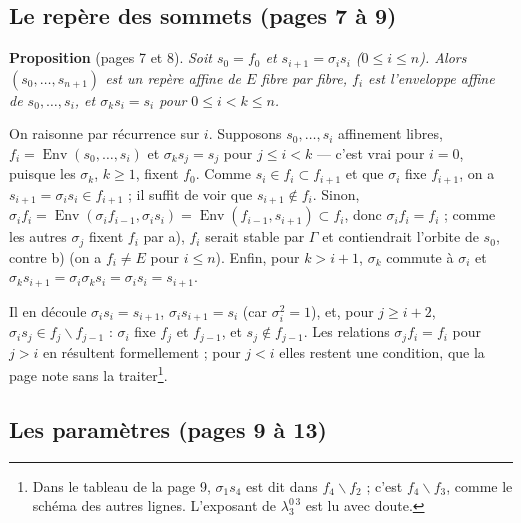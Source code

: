 \documentclass[11pt,a4paper]{article}
\begin{document}
\subsection*{Le repère des sommets (pages 7 à 9)}

\textbf{Proposition} (pages 7 et 8). \emph{Soit $s_0 = f_0$ et $s_{i+1} =
\sigma_i s_i$ ($0 \leq i \leq n$). Alors $(s_0, \dots, s_{n+1})$ est un repère
affine de $E$ fibre par fibre, $f_i$ est l'enveloppe affine de $s_0, \dots,
s_i$, et $\sigma_k s_i = s_i$ pour $0 \leq i < k \leq n$.}

On raisonne par récurrence sur $i$. Supposons $s_0, \dots, s_i$ affinement
libres, $f_i = \operatorname{Env}(s_0, \dots, s_i)$ et $\sigma_k s_j = s_j$ pour
$j \leq i < k$ --- c'est vrai pour $i = 0$, puisque les $\sigma_k$, $k \geq 1$,
fixent $f_0$. Comme $s_i \in f_i \subset f_{i+1}$ et que $\sigma_i$ fixe
$f_{i+1}$, on a $s_{i+1} = \sigma_i s_i \in f_{i+1}$ ; il suffit de voir que
$s_{i+1} \notin f_i$. Sinon, $\sigma_i f_i = \operatorname{Env}(\sigma_i f_{i-1},
\sigma_i s_i) = \operatorname{Env}(f_{i-1}, s_{i+1}) \subset f_i$, donc $\sigma_i
f_i = f_i$ ; comme les autres $\sigma_j$ fixent $f_i$ par a), $f_i$ serait
stable par $\Gamma$ et contiendrait l'orbite de $s_0$, contre b) (on a $f_i
\neq E$ pour $i \leq n$). Enfin, pour $k > i + 1$, $\sigma_k$ commute à
$\sigma_i$ et $\sigma_k s_{i+1} = \sigma_i \sigma_k s_i = \sigma_i s_i =
s_{i+1}$.

Il en découle $\sigma_i s_i = s_{i+1}$, $\sigma_i s_{i+1} = s_i$ (car
$\sigma_i^2 = 1$), et, pour $j \geq i + 2$, $\sigma_i s_j \in f_j \smallsetminus
f_{j-1}$ : $\sigma_i$ fixe $f_j$ et $f_{j-1}$, et $s_j \notin f_{j-1}$. Les
relations $\sigma_j f_i = f_i$ pour $j > i$ en résultent formellement ; pour
$j < i$ elles restent une condition, que la page note sans la
traiter\footnote{Dans le tableau de la page 9, $\sigma_1 s_4$ est dit dans $f_4
\smallsetminus f_2$ ; c'est $f_4 \smallsetminus f_3$, comme le schéma des autres
lignes. L'exposant de $\lambda_3^{0\,3}$ est lu avec doute.}.

\subsection*{Les paramètres (pages 9 à 13)}
\end{document}
